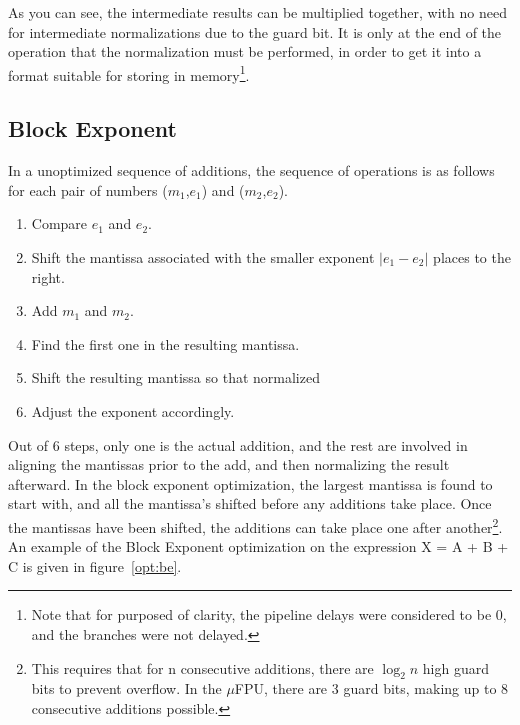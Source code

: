 %

As you can see, the intermediate results can be multiplied together, with no
need for intermediate normalizations due to the guard bit.  It is only at the
end of the operation that the normalization must be performed, in order to get
it into a format suitable for storing in memory\footnote{Note that for purposed
of clarity, the pipeline delays were considered to be 0, and the branches were
not delayed.}.

\subsection{Block Exponent}

In a unoptimized sequence of additions, the sequence of operations is as follows
for each pair of numbers ($m_1$,$e_1$) and ($m_2$,$e_2$).  \begin{enumerate}
	\item Compare $e_1$ and $e_2$.  \item Shift the mantissa associated with
		the smaller exponent $|e_1-e_2|$ places to the right.  \item Add
$m_1$ and $m_2$.  \item Find the first one in the resulting mantissa.  \item
Shift the resulting mantissa so that normalized \item Adjust the exponent
accordingly.  \end{enumerate}

Out of 6 steps, only one is the actual addition, and the rest are involved in
aligning the mantissas prior to the add, and then normalizing the result
afterward.  In the block exponent optimization, the largest mantissa is found to
start with, and all the mantissa's shifted before any additions take place.
Once the mantissas have been shifted, the additions can take place one after
another\footnote{This requires that for n consecutive additions, there are
$\log_{2}n$ high guard bits to prevent overflow.  In the $\mu$FPU, there are 3
guard bits, making up to 8 consecutive additions possible.}.  An example of the
Block Exponent optimization on the expression X = A + B + C is given in
figure~\ref{opt:be}.

